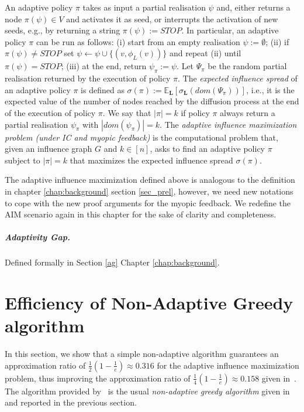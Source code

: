 An adaptive policy $\pi$ takes as input a partial realisation $\psi$ and, either returns a node $\pi(\psi)\in V$ and activates it as seed, or interrupts the activation of new seeds, e.g., by returning a string $\pi(\psi):=STOP$. In particular, an adaptive policy $\pi$ can be run as follows: (i) start from an empty realisation $\psi:=\emptyset$; (ii) if $\pi(\psi)\neq STOP$ set $\psi\leftarrow \psi\cup \{(v,\phi_L(v))\}$ and repeat (ii) until $\pi(\psi)=STOP$; (iii) at the end,  return $\psi_{\pi}:=\psi$. Let $\Psi_{\pi}$ be the random partial realisation returned by the execution of policy $\pi$. The {\em expected influence spread} of an adaptive policy $\pi$ is defined as $\sigma(\pi):=\mathbb{E}_{\bm L}[\sigma_{\bm L}(dom(\Psi_{\pi}))]$, i.e., it is the expected value of the number of nodes reached by the diffusion process at the end of the execution of policy $\pi$. We say that $|\pi|=k$ if policy $\pi$ always return a partial realisation $\psi_{\pi}$ with $|dom(\psi_{\pi})|=k$. The {\em adaptive influence maximization problem (under IC and myopic feedback)} is the computational problem that, given an influence graph $G$ and $k\in [n]$, asks to find an adaptive policy $\pi$ subject to $|\pi|=k$ that maximizes the expected influence spread $\sigma(\pi)$. 

The adaptive influence maximization defined above is analogous to the definition in chapter \ref{chap:background} section \ref{sec_prel}, however, we need new notations to cope with the new proof arguments for the myopic feedback. We redefine the AIM scenario again in this chapter for the sake of clarity and completeness.

\subparagraph*{Adaptivity Gap.} Defined formally in Section \ref{ag} Chapter \ref{chap:background}.


\section{Efficiency of Non-Adaptive Greedy algorithm} \label{sec_nag}
In this section, we show that a simple non-adaptive algorithm guarantees an approximation ratio of $\frac{1}{2}\left(1-\frac{1}{e}\right)\approx 0.316$ for the adaptive influence maximization problem, thus improving the approximation ratio of $\frac{1}{4}\left(1-\frac{1}{e}\right)\approx 0.158$ given in~\cite{Peng2019}. The algorithm provided by~\cite{Peng2019} is the usual {\em non-adaptive greedy algorithm} given in~\cite{Kempe2015} and reported in the previous section.

